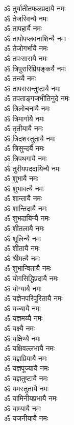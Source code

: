 \begin{flushleft}
\begin{multicols}{2}
ॐ तुर्यातीतफलप्रदायै नमः\\
ॐ तेजस्विन्यै नमः\\
ॐ तापहार्यै नमः\\
ॐ तापोपप्लवनाशिन्यै नमः\\
ॐ तेजोगर्भायै नमः\\
ॐ तपःसारायै नमः\hfill{}\\
ॐ त्रिपुरारिप्रियङ्कर्यै नमः\\
ॐ तन्व्यै नमः\\
ॐ तापससन्तुष्टायै नमः\\
ॐ तपताङ्गजभीतिनुदे नमः\\
ॐ त्रिलोचनायै नमः\\
ॐ त्रिमार्गायै नमः\\
ॐ तृतीयायै नमः\\
ॐ त्रिदशस्तुतायै नमः\\
ॐ त्रिसुन्दर्यै नमः\\
ॐ त्रिपथगायै नमः\hfill{}\\
ॐ तुरीयपददायिन्यै नमः\\
ॐ शुभायै नमः\\
ॐ शुभावत्यै नमः\\
ॐ शान्तायै नमः\\
ॐ शान्तिदायै नमः\\
ॐ शुभदायिन्यै नमः\\
ॐ शीतलायै नमः\\
ॐ शूलिन्यै नमः\\
ॐ शीतायै नमः\\
ॐ श्रीमत्यै नमः\hfill{}\\
ॐ शुभान्वितायै नमः\\
ॐ योगसिद्धिप्रदायै नमः\\
ॐ योग्यायै नमः\\
ॐ यज्ञेनपरिपूरितायै नमः\\
ॐ यज्यायै नमः\\
ॐ यज्ञमय्यै नमः\\
ॐ यक्ष्यै नमः\\
ॐ यक्षिण्यै नमः\\
ॐ यक्षिवल्लभायै नमः\\
ॐ यज्ञप्रियायै नमः\hfill{}\\
ॐ यज्ञपूज्यायै नमः\\
ॐ यज्ञतुष्टायै नमः\\
ॐ यमस्तुतायै नमः\\
ॐ यामिनीयप्रभायै नमः\\
ॐ याम्यायै नमः\\
ॐ यजनीयायै नमः\\

\end{multicols}
\end{flushleft}
